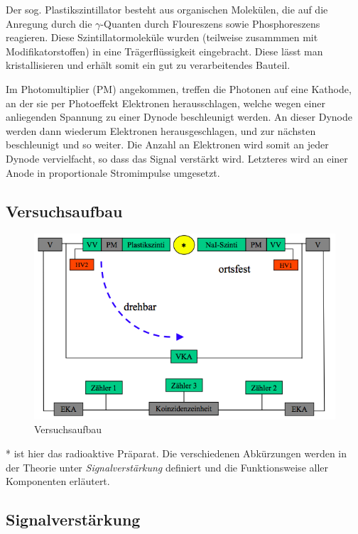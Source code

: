 Der sog. Plastikszintillator besteht aus organischen Molekülen, die auf die Anregung durch die $\gamma$-Quanten durch Floureszens sowie Phosphoreszens reagieren. Diese Szintillator\-moleküle wurden (teilweise zusammmen mit Modifikatorstoffen) in eine Trägerflüssigkeit eingebracht. Diese lässt man kristallisieren und erhält somit ein gut zu verarbeitendes Bauteil.

Im Photomultiplier (PM) angekommen, treffen die Photonen auf eine Kathode, an der sie per Photoeffekt Elektronen herausschlagen, welche wegen einer anliegenden Spannung zu einer Dynode beschleunigt werden. An dieser Dynode werden dann wiederum Elektronen herausgeschlagen, und zur nächsten beschleunigt und so weiter. Die Anzahl an Elektronen wird somit an jeder Dynode vervielfacht, so dass das Signal verstärkt wird. Letzteres wird an einer Anode in proportionale Stromimpulse umgesetzt.

\subsection{Versuchsaufbau}

\begin{figure}[H]
\centering \includegraphics[width = \textwidth]{Bilder/Aufbau.png}
\caption{Versuchsaufbau}
\end{figure}

* ist hier das radioaktive Präparat. Die verschiedenen Abkürzungen werden in der Theorie unter \emph{Signalverstärkung} definiert und die Funktionsweise aller Komponenten erläutert.

\subsection{Signalverstärkung}

